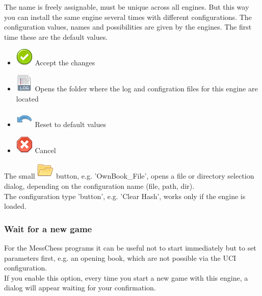 \documentclass[11pt,a4paper]{article}
\begin{document}
The name is freely assignable, must be unique across all engines. But this way you can install the same engine several times with different configurations. The configuration values, names and possibilities are given by the engines. The first time these are the default values.
\begin{itemize}
	\item \includegraphics[scale=0.5]{accept_button.png} Accept the changes
	\item \includegraphics[scale=0.5]{file_extension_log.png} Opens the folder where the log and configration files for this engine are located
	\item \includegraphics[scale=0.5]{undo.png} Reset to default values
	\item \includegraphics[scale=0.5]{cancel.png} Cancel
\end{itemize}
The small \includegraphics[scale=0.3]{folder.png} button, e.g. 'OwnBook\_File', opens a file or directory selection dialog, depending on the configuration name (file, path, dir).\\
The configuration type 'button', e.g. 'Clear Hash', works only if the engine is loaded.

\subsubsection{Wait for a new game} \label{WaitForANewgame}
For the MessChess programs it can be useful not to start immediately but to set parameters first, e.g. an opening book, which are not possible via the UCI configuration.\\
If you enable this option, every time you start a new game with this engine, a dialog will appear waiting for your confirmation.
\end{document}
